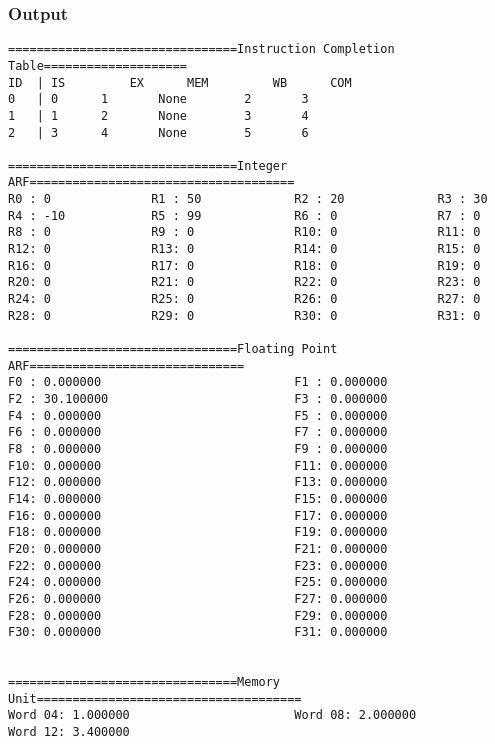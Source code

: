 \documentclass[12pt]{article}
\begin{document}
\subsubsection*{Output}
\begin{verbatim}
================================Instruction Completion Table====================
ID	| IS		 EX		 MEM		 WB		 COM
0	| 0		 1		 None		 2		 3
1	| 1		 2		 None		 3		 4
2	| 3		 4		 None		 5		 6

================================Integer ARF=====================================
R0 : 0              R1 : 50             R2 : 20             R3 : 30             
R4 : -10            R5 : 99             R6 : 0              R7 : 0              
R8 : 0              R9 : 0              R10: 0              R11: 0              
R12: 0              R13: 0              R14: 0              R15: 0              
R16: 0              R17: 0              R18: 0              R19: 0              
R20: 0              R21: 0              R22: 0              R23: 0              
R24: 0              R25: 0              R26: 0              R27: 0              
R28: 0              R29: 0              R30: 0              R31: 0              

================================Floating Point ARF==============================
F0 : 0.000000                           F1 : 0.000000                           
F2 : 30.100000                          F3 : 0.000000                           
F4 : 0.000000                           F5 : 0.000000                           
F6 : 0.000000                           F7 : 0.000000                           
F8 : 0.000000                           F9 : 0.000000                           
F10: 0.000000                           F11: 0.000000                           
F12: 0.000000                           F13: 0.000000                           
F14: 0.000000                           F15: 0.000000                           
F16: 0.000000                           F17: 0.000000                           
F18: 0.000000                           F19: 0.000000                           
F20: 0.000000                           F21: 0.000000                           
F22: 0.000000                           F23: 0.000000                           
F24: 0.000000                           F25: 0.000000                           
F26: 0.000000                           F27: 0.000000                           
F28: 0.000000                           F29: 0.000000                           
F30: 0.000000                           F31: 0.000000                           


================================Memory Unit=====================================
Word 04: 1.000000                       Word 08: 2.000000                       
Word 12: 3.400000 
\end{verbatim}
\end{document}
